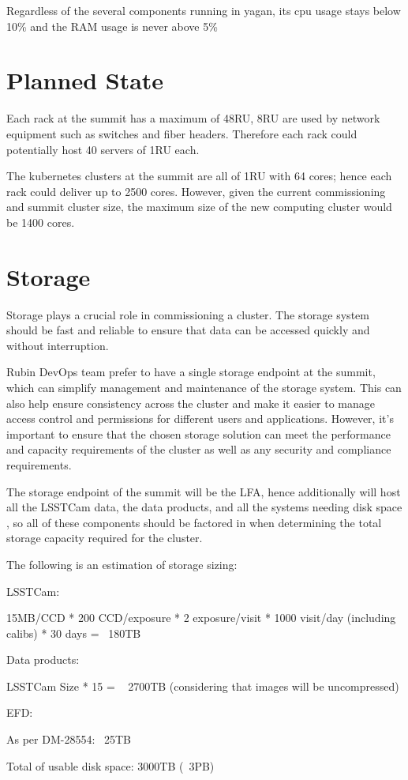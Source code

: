 Regardless of the several components running in yagan, its cpu usage stays below 10\% and the RAM usage is never above 5\%


\section{Planned State}

Each rack at the summit has a maximum of 48RU, 8RU are used by network equipment such as switches and fiber headers. Therefore each rack could potentially host 40 servers of 1RU each.

The kubernetes clusters at the summit are all of 1RU with 64 cores; hence each rack could deliver up to 2500 cores. However, given the current commissioning and summit cluster size, the maximum size of the new computing cluster would be 1400 cores. 

\section{Storage}

Storage plays a crucial role in commissioning a cluster. The storage system should be fast and reliable to ensure that data can be accessed quickly and without interruption.

Rubin DevOps team prefer to have a single storage endpoint at the summit, which can simplify management and maintenance of the storage system. This can also help ensure consistency across the cluster and make it easier to manage access control and permissions for different users and applications. However, it's important to ensure that the chosen storage solution can meet the performance and capacity requirements of the cluster as well as any security and compliance requirements. 

The storage endpoint of the summit will be the LFA, hence additionally will host all the LSSTCam data, the data products, and all the systems needing disk space , so all of these components should be factored in when determining the total storage capacity required for the cluster.

The following is an estimation of storage sizing:

LSSTCam:

15MB/CCD * 200 CCD/exposure * 2 exposure/visit * 1000 visit/day (including calibs) * 30 days = ~180TB

Data products:

LSSTCam Size * 15 = ~ 2700TB (considering that images will be uncompressed)

EFD:

As per DM-28554: ~25TB

Total of usable disk space: 3000TB (~3PB) 